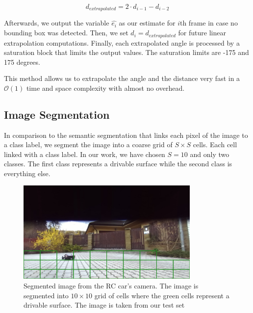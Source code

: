 \documentclass{ctuthesis/ctuthesis}
\begin{document}
\begin{equation}
d_{extrapolated} = 2\cdot d_{i-1} - d_{i-2}
\end{equation}

Afterwards, we output the variable $\hat{e_{i}}$ as our estimate for $i$th frame in case no bounding box was detected. Then, we set $d_i = d_{extrapolated}$ for future linear extrapolation computations. Finally, each extrapolated angle is processed by a saturation block that limits the output values. The saturation limits are -175 and 175 degrees. \par


This method allows us to extrapolate the angle and the distance very fast in a $\mathcal{O}(1)$ time and space complexity with almost no overhead.




\subsection{Image Segmentation}\label{s:Image_Segmentation}
In comparison to the semantic segmentation that links each pixel of the image to a class label, we segment the image into a coarse grid of $S\times S$ cells. Each cell linked with a class label. In our work, we have chosen $S=10$ and only two classes. The first class represents a drivable surface while the second class is everything else. \par


\begin{figure}[h!]
    \centering
    \includegraphics[width=0.8\textwidth]{images/segmented_image.png}
    
    \caption[Segmented image from the RC car's camera]{Segmented image from the RC car's camera. The image is segmented into $10\times 10$ grid of cells where the green cells represent a drivable surface. The image is taken from our test set}\label{f:segmented_image}
\end{figure}
\end{document}
